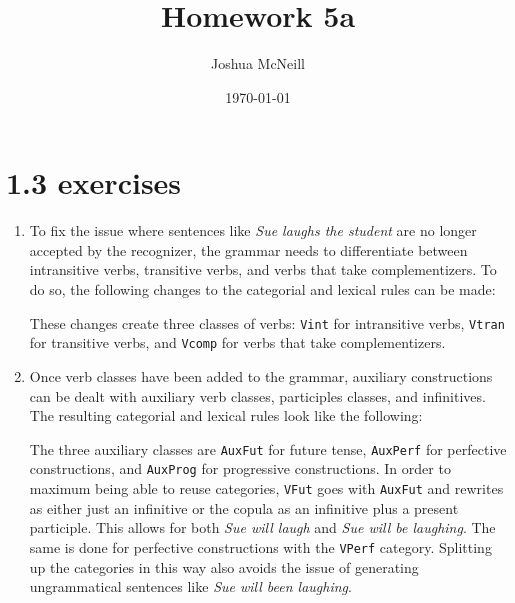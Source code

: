 \documentclass{article}
\title{Homework 5a}
\author{Joshua McNeill}
\date{\today}
\newcommand{\sent}[1]{\textit{#1}}
\begin{document}
  \maketitle
  \section{1.3 exercises}
    \begin{enumerate}
      \item To fix the issue where sentences like \sent{Sue laughs the student} are no longer accepted by the recognizer, the grammar needs to differentiate between intransitive verbs, transitive verbs, and verbs that take complementizers. To do so, the following changes to the categorial and lexical rules can be made:

      \begin{minipage}[t]{0.5\linewidth}
        
      \end{minipage}
      \begin{minipage}[t]{0.5\linewidth}
        
      \end{minipage}
      These changes create three classes of verbs: \texttt{Vint} for intransitive verbs, \texttt{Vtran} for transitive verbs, and \texttt{Vcomp} for verbs that take complementizers.
      \item Once verb classes have been added to the grammar, auxiliary constructions can be dealt with auxiliary verb classes, participles classes, and infinitives. The resulting categorial and lexical rules look like the following:

      \begin{minipage}[t]{0.5\linewidth}
        
      \end{minipage}
      \begin{minipage}[t]{0.5\linewidth}
        
      \end{minipage}
      The three auxiliary classes are \texttt{AuxFut} for future tense, \texttt{AuxPerf} for perfective constructions, and \texttt{AuxProg} for progressive constructions. In order to maximum being able to reuse categories, \texttt{VFut} goes with \texttt{AuxFut} and rewrites as either just an infinitive or the copula as an infinitive plus a present participle. This allows for both \sent{Sue will laugh} and \sent{Sue will be laughing}. The same is done for perfective constructions with the \texttt{VPerf} category. Splitting up the categories in this way also avoids the issue of generating ungrammatical sentences like \sent{Sue will been laughing}.
    \end{enumerate}
\end{document}
